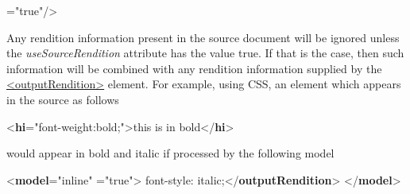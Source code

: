 \begin{shaded}
{\hspace*{1em}{useSourceRendition}="{true}"/>}\end{shaded}\egroup\par \noindent  Any rendition information present in the source document will be ignored unless the {\itshape useSourceRendition} attribute has the value true. If that is the case, then such information will be combined with any rendition information supplied by the \hyperref[TEI.outputRendition]{<outputRendition>} element. For example, using CSS, an element which appears in the source as follows \par\bgroup{}\exampleFont \begin{shaded}\noindent\mbox{}{<\textbf{hi}\hspace*{1em}{style}="{font-weight:bold;}">}this is in bold{</\textbf{hi}>}\end{shaded}\egroup\par \noindent  would appear in bold and italic if processed by the following model \par\bgroup{}\exampleFont \begin{shaded}\noindent\mbox{}{<\textbf{model}\hspace*{1em}{behaviour}="{inline}"\mbox{}\newline 
\hspace*{1em}{useSourceRendition}="{true}">}\mbox{}\newline 
{}font-style: italic;{</\textbf{outputRendition}>}\mbox{}\newline 
{</\textbf{model}>}\end{shaded}\egroup\par 

